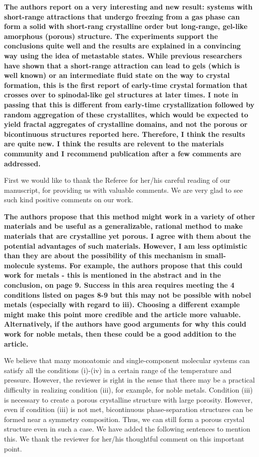 \documentclass[11pt,a4paper]{article}
\newenvironment{referee}%
{\bigskip\singlespacing\bf}%
{\par\bigskip}
\begin{document}
\begin{referee}
The authors report on a very interesting and new result: systems with short-range attractions that undergo freezing from a gas phase can form a solid with short-rang crystalline order but long-range, gel-like amorphous (porous) structure. The experiments support the conclusions quite well and the results are explained in a convincing way using the idea of metastable states. While previous researchers have shown that a short-range attraction can lead to gels (which is well known) or an intermediate fluid state on the way to crystal formation, this is the first report of early-time crystal formation that crosses over to spinodal-like gel structures at later times. I note in passing that this is different from early-time crystallization followed by random aggregation of these crystallites, which would be expected to yield fractal aggregates of crystalline domains, and not the porous or bicontinuous structures reported here. Therefore, I think the results are quite new. I think the results are relevent to the 
materials community and I recommend publication after a few comments are addressed.
\end{referee}

First we would like to thank the Referee for her/his careful reading of our manuscript, for providing us with valuable comments. We are very glad to see such kind positive comments on our work.


\begin{referee}
The authors propose that this method might work in a variety of other materials and be useful as a generalizable, rational method to make materials that are crystalline yet porous. I agree with them about the potential advantages of such materials. However, I am less optimistic than they are about the possibility of this mechanism in small-molecule systems. For example, the authors propose that this could work for metals - this is mentioned in the abstract and in the conclusion, on page 9. Success in this area requires meeting the 4 conditions listed on pages 8-9 but this may not be possible with nobel metals (especially with regard to iii). Choosing a different example might make this point more credible and the article more valuable. Alternatively, if the authors have good arguments for why this could work for noble metals, then these could be a good addition to the article.
\end{referee}

We believe that many monoatomic and single-component molecular systems can satisfy all the conditions (i)-(iv) in a certain range of the temperature and pressure. However, the reviewer 
is right in the sense that there may be a practical difficulty in realizing condition (iii), for example, for noble metals. 
Condition (iii) is necessary to create a porous crystalline structure with large porosity. However, even if condition (iii) is not met, bicontinuous phase-separation structures 
can be formed near a symmetry composition. Thus, we can still form a porous crystal structure even in such a case. We have added the following sentences to mention this. 
We thank the reviewer for her/his thoughtful comment on this important point.  
\end{document}
